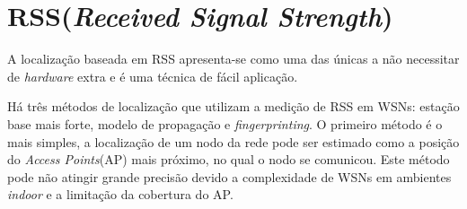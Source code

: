 \section{RSS(\textit{Received Signal Strength})}	
	A localização baseada em RSS apresenta-se como uma das únicas a não necessitar de \textit{hardware} extra e é uma técnica
de fácil aplicação. 
	
	Há três métodos de localização que utilizam a medição de RSS em WSNs: estação base mais forte, modelo de propagação e \textit{fingerprinting}.
	O primeiro método é o mais simples, a localização de um nodo da rede pode ser estimado como a posição do \textit{Access Points}(AP) mais próximo, no 
	qual o nodo se comunicou. Este método pode não atingir grande precisão devido a complexidade de WSNs em ambientes \textit{indoor} e 
	a limitação da cobertura do AP.
	
